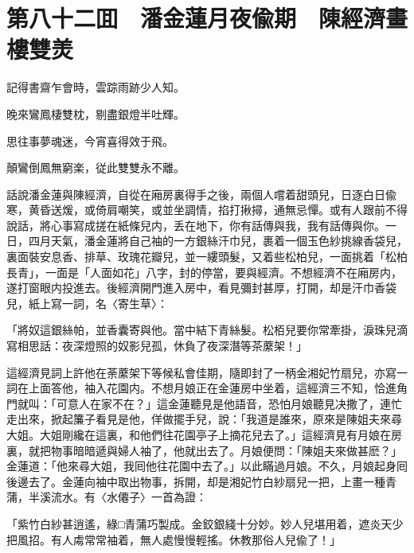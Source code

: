 \chapter*{第八十二囬　潘金蓮月夜偸期　陳經濟畫樓雙羙}

記得書齋乍會時，雲踪雨跡少人知。

晚來鸞鳳棲雙枕，剔盡銀燈半吐輝。

思往事夢魂迷，今宵喜得效于飛。

顛鸞倒鳳無窮楽，従此雙雙永不離。

話說潘金蓮與陳經濟，自從在廂房裏得手之後，兩個人嚐着甜頭兒，日逐白日偸寒，黄昏送煖，或倚肩嘲笑，或並坐調情，掐打揪撏，通無忌憚。或有人跟前不得說話，將心事寫成搓在紙條兒内，丢在地下，你有話傳與我，我有話傳與你。一日，四月天氣，潘金蓮將自己袖的一方銀絲汗巾兒，裹着一個玉色紗挑線香袋兒，裏面裝安息香、排草、玫瑰花瓣兒，並一縷頭髮，又着些松柏兒，一面挑着「松柏長青」，一面是「人面如花」八字，封的停當，要與經濟。不想經濟不在廂房内，遂打窗眼内投進去。後經濟開門進入房中，看見彌封甚厚，打開，却是汗巾香袋兒，紙上寫一詞，名〈寄生草〉：

「將奴這銀絲帕，並香囊寄與他。當中結下青絲髮。松栢兒要你常牽掛，淚珠兒滴寫相思話：夜深燈照的奴影兒孤，休負了夜深潛等茶䕷架！」

這經濟見詞上許他在荼䕷架下等候私會佳期，隨即封了一柄金湘妃竹扇兒，亦寫一詞在上面答他，袖入花園内。不想月娘正在金蓮房中坐着，這經濟三不知，恰進角門就叫：「可意人在家不在？」這金蓮聽見是他語音，恐怕月娘聽見决撒了，連忙走出來，掀起簾子看見是他，佯做擺手兒，說：「我道是誰來，原來是陳姐夫來尋大姐。大姐剛纔在這裏，和他們往花園亭子上摘花兒去了。」這經濟見有月娘在房裏，就把物事暗暗遞與婦人袖了，他就出去了。月娘便問：「陳姐夫來做甚麽？」金蓮道：「他來尋大姐，我囘他往花園中去了。」以此瞞過月娘。不久，月娘起身囘後邊去了。金蓮向袖中取出物事，拆開，却是湘妃竹白紗扇兒一把，上畫一種青蒲，半溪流水。有〈水僊子〉一首為證：

「紫竹白紗甚逍遙，綠□青蒲巧製成。金鉸銀綫十分妙。妙人兒堪用着，遮炎天少把風招。有人䖏常常袖着，無人處慢慢輕搖。休教那俗人兒偸了！」


